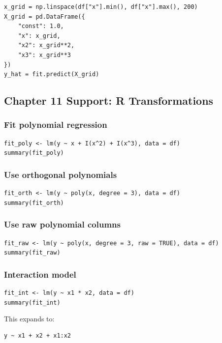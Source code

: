 \begin{verbatim}
x_grid = np.linspace(df["x"].min(), df["x"].max(), 200)
X_grid = pd.DataFrame({
    "const": 1.0,
    "x": x_grid,
    "x2": x_grid**2,
    "x3": x_grid**3
})
y_hat = fit.predict(X_grid)
\end{verbatim}

\subsection{Chapter 11 Support: R Transformations}
\label{app:ch11-software-cookbook-r}

\subsubsection*{Fit polynomial regression}

\begin{verbatim}
fit_poly <- lm(y ~ x + I(x^2) + I(x^3), data = df)
summary(fit_poly)
\end{verbatim}

\subsubsection*{Use orthogonal polynomials}

\begin{verbatim}
fit_orth <- lm(y ~ poly(x, degree = 3), data = df)
summary(fit_orth)
\end{verbatim}

\subsubsection*{Use raw polynomial columns}

\begin{verbatim}
fit_raw <- lm(y ~ poly(x, degree = 3, raw = TRUE), data = df)
summary(fit_raw)
\end{verbatim}

\subsubsection*{Interaction model}

\begin{verbatim}
fit_int <- lm(y ~ x1 * x2, data = df)
summary(fit_int)
\end{verbatim}

This expands to:

\begin{verbatim}
y ~ x1 + x2 + x1:x2
\end{verbatim}

